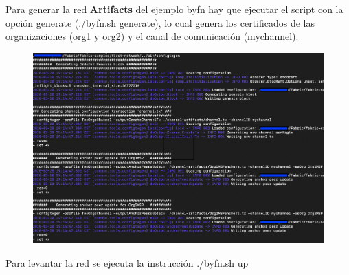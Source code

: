 \documentclass[12pt]{report}
\begin{document}
	\newpage
	Para generar la red \textbf{Artifacts} del ejemplo byfn hay que ejecutar el script con la opción generate (./byfn.sh generate), lo cual genera los certificados de las organizaciones (org1 y org2) y el canal de comunicación (mychannel).\\
	
	\begin{figure}[h]
		\includegraphics[scale=0.5]{byfn-generate}
		\centering
	\end{figure}
	
	\newpage
	Para levantar la red se ejecuta la instrucción ./byfn.sh up
	
	
	
\end{document}
